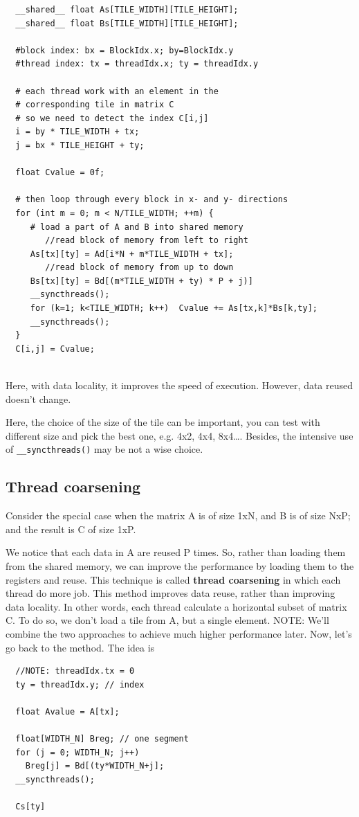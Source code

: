 \begin{lstlisting}
  __shared__ float As[TILE_WIDTH][TILE_HEIGHT]; 
  __shared__ float Bs[TILE_WIDTH][TILE_HEIGHT];
  
  #block index: bx = BlockIdx.x; by=BlockIdx.y
  #thread index: tx = threadIdx.x; ty = threadIdx.y
  
  # each thread work with an element in the
  # corresponding tile in matrix C
  # so we need to detect the index C[i,j]
  i = by * TILE_WIDTH + tx;
  j = bx * TILE_HEIGHT + ty;

  float Cvalue = 0f;
 
  # then loop through every block in x- and y- directions
  for (int m = 0; m < N/TILE_WIDTH; ++m) {
     # load a part of A and B into shared memory
        //read block of memory from left to right
     As[tx][ty] = Ad[i*N + m*TILE_WIDTH + tx];
        //read block of memory from up to down
     Bs[tx][ty] = Bd[(m*TILE_WIDTH + ty) * P + j)]
     __syncthreads();
     for (k=1; k<TILE_WIDTH; k++)  Cvalue += As[tx,k]*Bs[k,ty];
     __syncthreads();
  }
  C[i,j] = Cvalue;
  
\end{lstlisting}
Here, with data locality, it improves the
speed of execution. However, data reused doesn't change. 

Here, the choice of the size of the tile can be important, you can test with
different size and pick the best one, e.g. 4x2, 4x4, 8x4\ldots. Besides, the
intensive use of \verb!__syncthreads()! may be not a wise choice. 



\subsection{Thread coarsening}
\label{sec:Thread_coarsening}

Consider the special case
when the matrix A is of size 1xN, and B is of size NxP; and the result is C of
size 1xP.

We notice that each data in A are reused P times. So, rather than loading them from the
shared memory, we can improve the performance by loading them to the registers
and reuse. This technique is called {\bf thread coarsening} in which each thread
do more job. This method improves data reuse, rather
than improving data locality. 
In other words, each thread calculate a horizontal subset of matrix
C. To do so, we don't load a 
tile from A, but a single element.  NOTE: We'll combine the two approaches to
achieve much higher performance later. Now, let's go back to the method. The
idea is
\begin{lstlisting}
  //NOTE: threadIdx.tx = 0
  ty = threadIdx.y; // index
  
  float Avalue = A[tx];
  
  float[WIDTH_N] Breg; // one segment
  for (j = 0; WIDTH_N; j++)
    Breg[j] = Bd[(ty*WIDTH_N+j];
  __syncthreads();
  
  Cs[ty]
\end{lstlisting}


